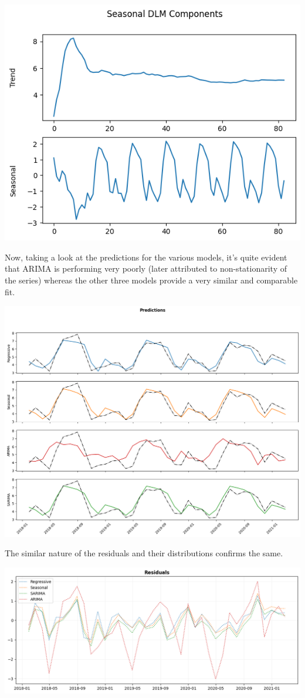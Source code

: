 \documentclass[a4paper,12pt]{article}
\begin{document}
\begin{center}
\includegraphics[width=0.7\linewidth]{./images/tiru/monthlySeasDecomp.png}
\end{center}

Now, taking a look at the predictions for the various models, it's quite evident that ARIMA is performing very poorly (later attributed to non-stationarity of the series) whereas the other three models provide a very similar and comparable fit.

\begin{center}
\includegraphics[width=1.00\textwidth]{./images/tiru/monthlyPred.png}
\end{center}

The similar nature of the residuals and their distributions confirms the same.

\begin{center}
\includegraphics[width=1.00\textwidth]{./images/tiru/monthlyResid.png}
\end{center}
\end{document}
